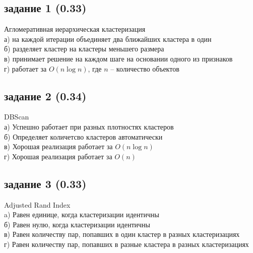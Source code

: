\documentclass[10pt,a4paper]{article}
\begin{document}
\subsection*{задание 1 (0.33)}

Агломеративная иерархическая кластеризация \\
а) на каждой итерации объединяет два ближайших кластера в один \\
б) разделяет кластер на кластеры меньшего размера \\
в) принимает решение на каждом шаге на основании одного из признаков \\
г) работает за $O(n \log n)$, где $n$ -- количество объектов

\subsection*{задание 2 (0.34)}

DBScan \\
а) Успешно работает при разных плотностях кластеров \\
б) Определяет количетсво кластеров автоматически \\
в) Хорошая реализация работает за $O(n \log n)$ \\
г) Хорошая реализация работает за $O(n)$

\subsection*{задание 3 (0.33)}

Adjusted Rand Index \\
a) Равен единице, когда кластеризации идентичны \\
б) Равен нулю, когда кластеризации идентичны \\
в) Равен количеству пар, попавших в один кластер в разных кластеризациях \\
г) Равен количеству пар, попавших в разные кластера в разных кластеризациях
\end{document}
